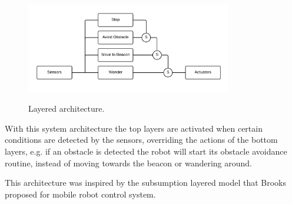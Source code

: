 \documentclass[oribibl]{llncs}
\begin{document}
\begin{figure}
  \centering
  \includegraphics[width=0.8\textwidth]{layer-architecture.png}
  \label{fig:layered}
  \caption{Layered architecture.}
\end{figure}

With this system architecture the top layers are activated when certain conditions are detected by the sensors, overriding the actions of the bottom layers, e.g. if an obstacle is detected the robot will start its obstacle avoidance routine, instead of moving towards the beacon or wandering around. 

This architecture was inspired by the subsumption layered model that Brooks proposed for mobile robot control system.\cite{Brooks_1986}
\end{document}
